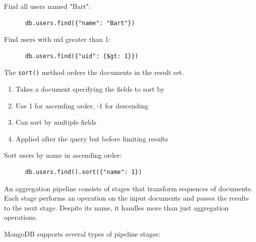\documentclass{article}
\begin{document}
  \begin{example}
    Find all users named "Bart":
    \begin{lstlisting}
      db.users.find({"name": "Bart"})
    \end{lstlisting}
    Find users with uid greater than 1:
    \begin{lstlisting}
      db.users.find({"uid": {$gt: 1}})
    \end{lstlisting}
  \end{example}

  \begin{definition}[sort()]
    The \texttt{sort()} method orders the documents in the result set.
    \begin{enumerate}
      \item Takes a document specifying the fields to sort by
      \item Use 1 for ascending order, -1 for descending
      \item Can sort by multiple fields
      \item Applied after the query but before limiting results
    \end{enumerate}
  \end{definition}

  \begin{example}[Sorting]
    Sort users by name in ascending order:
    \begin{lstlisting}
      db.users.find().sort({"name": 1})
    \end{lstlisting}
  \end{example}


  \begin{definition}
    An aggregation pipeline consists of stages that transform sequences of documents. Each stage performs an operation on the input documents and passes the results to the next stage. Despite its name, it handles more than just aggregation operations.
  \end{definition}

  MongoDB supports several types of pipeline stages:
\end{document}
